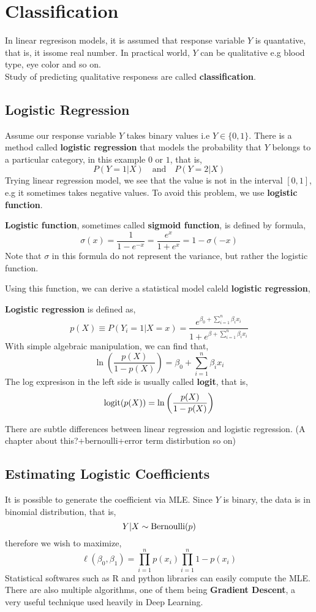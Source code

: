 \chapter{Classification}
In linear regresison models, it is assumed that response variable $Y$ is quantative, that is, it issome real number. In practical world, $Y$ can be qualitative e.g blood type, eye color and so on. \\
Study of predicting qualitative responess are called \textbf{classification}.
\section{Logistic Regression}
Assume our response variable $Y$ takes binary values i.e $Y \in \{0, 1 \}$. There is a method called \textbf{logistic regression} that models the probability that $Y$ belongs to a particular category, in this example $0$ or $1$, that is,
\[P(Y = 1| X ) \quad \text{and} \quad P(Y = 2| X) \]
Trying linear regression model, we see that the value is not in the interval $[0,1]$, e.g it sometimes takes negative values. To avoid this problem, we use \textbf{logistic function}.
\begin{definition}
    \textbf{Logistic function}, sometimes called \textbf{sigmoid function}, is  defined by formula,
    \[\sigma(x)  = \frac{1}{1- e^{-x}} = \frac{e^x}{1+e^x} = 1 - \sigma(-x)\]
Note that $\sigma$ in this formula do not represent the variance, but rather the logistic function.
\end{definition}
Using this function, we can derive a statistical model caleld \textbf{logistic regression},
\begin{definition}
    \textbf{Logistic regression} is defined as,
    \[ p(X) \equiv P(Y_i = 1| X = x) = \frac{e^{\beta_0 + \sum_{i=1}^n\beta_i x_i}} {1+e^{\beta + \sum_{i=1}^n\beta_i x_i}} \]
    With simple algebraic manipulation, we can find that,
    \[ \ln\left( \frac{p(X)}{1-p(X)}\right) = \beta_0 +\sum_{i=1}^n\beta_i x_i\]
    The log expresison in the left side is usually called \textbf{logit}, that is,
    \[\operatorname{logit}(p(X))= \ln\left( \frac{p(X)}{1-p(X)}\right)\]
\end{definition}
There are subtle differences between linear regression and logistic regression. (A chapter about this?+bernoulli+error term distirbution so on)
\section{Estimating Logistic Coefficients}
It is possible to generate the coefficient via MLE. Since $Y$ is binary, the data is in binomial distribution, that is,
\[ Y | X \sim \operatorname{Bernoulli}(p)\]
therefore we wish to maximize,
\[ \ell(\beta_0, \beta_1) = \prod_{i = 1}^n p(x_i) \prod_{i = 1}^n 1-p(x_i) \]
Statistical softwares such as R and python libraries can easily compute the MLE. There are also multiple algorithms, one of them being \textbf{Gradient Descent}, a very useful technique used heavily in Deep Learning.
